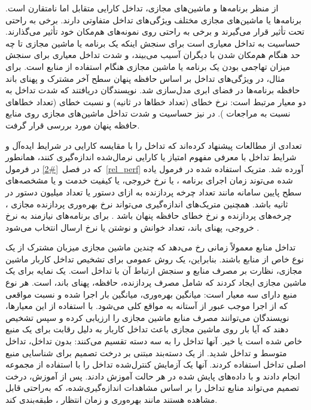 از منظر برنامه‌ها و ماشین‌های مجازی، تداخل کارایی متقابل اما نامتقارن است. برنامه‌ها یا ماشین‌های مجازی مختلف ویژگی‌های تداخل متفاوتی دارند. برخی به ‌راحتی تحت تأثیر قرار می‌گیرند و برخی به ‌راحتی روی نمونه‌های هم‌مکان خود تأثیر می‌گذارند. حساسیت به تداخل معیاری است برای سنجش اینکه یک برنامه یا ماشین مجازی تا چه حد هنگام هم‌مکان شدن با دیگران آسیب می‌بیند، و شدت تداخل معیاری برای سنجش میزان تهاجمی بودن یک برنامه یا ماشین مجازی هنگام استفاده از منابع است. برای مثال، در \cite{kim2013vmconsolidation} ویژگی‌های تداخل بر اساس حافظه پنهان سطح آخر  مشترک و پهنای باند حافظه برنامه‌ها در فضای ابری مدل‌سازی شد. نویسندگان دریافتند که شدت تداخل به دو معیار مرتبط است: نرخ خطای  (تعداد خطاها در ثانیه) و نسبت خطای  (تعداد خطاهای  نسبت به مراجعات ). در \cite{Chen2016Cache} نیز حساسیت و شدت تداخل ماشین‌های مجازی روی منابع حافظه پنهان مورد بررسی قرار گرفت.

تعدادی از مطالعات پیشنهاد کرده‌اند که تداخل را با مقایسه کارایی در شرایط ایده‌آل و شرایط تداخل با معرفی مفهوم امتیاز یا کارایی نرمال‌شده اندازه‌گیری کنند\cite{novakovic2013deepdive, cheng2017precise}، همانطور که در فصل~\ref{#2} در فرمول~\ref{rel_perf} آورده شد. متریک استفاده شده در فرمول یاده شده می‌توند زمان اجرای برنامه \cite{ novakovic2013deepdive, Zhao2016Interference, Chen2017Prophet, Javadi2016UIE}، یا نرخ خروجی\cite{Chiang2011TRACON}، یا کیفیت خدمت \cite{Yang2013BubbleFluxConf} و یا مشخصه‌های سطح پایین سامانه مانند تعداد چرخه پردازنده به ازای دستور  یا تعداد میلیون دستور در ثانیه  \cite{novakovic2013deepdive, cheng2017precise, Zhang2013CPI2} باشد. همچنین متریک‌های اندازه‌گیری می‌تواند نرخ بهره‌وری پردازنده مجازی ، چرخه‌های پردازنده و نرخ خطای حافظه پنهان باشد \cite{Sun2014MVEI}. برای برنامه‌های نیازمند به  نرخ خروجی، پهنای باند، تعداد خوانش و نوشتن یا نرخ ارسال انتخاب می‌شود \cite{Casale2011StorageIO}.

تداخل منابع معمولاً زمانی رخ می‌دهد که چندین ماشین مجازی میزبان مشترک از یک نوع خاص از منابع باشند. بنابراین، یک روش عمومی برای تشخیص تداخل کاربار ماشین مجازی، نظارت بر مصرف منابع و سنجش ارتباط آن با تداخل است. \cite{Peng2018VMProfiling} یک نمایه برای یک ماشین مجازی ایجاد کردند که شامل مصرف پردازنده،‌ حافظه، پهنای باند،  است. هر نوع منبع دارای سه معیار است: میانگین بهره‌وری، میانگین بار اجرا شده و نسبت مواقعی که از اجرا موجب عبور از آستانه به مواقع کلی می‌شود. با استفاده از این معیارها، نویسندگان می‌توانند مصرف منابع ماشین مجازی را ارزیابی کرده و سپس تشخیص دهند که آیا بار روی ماشین مجازی باعث تداخل کاربار به دلیل رقابت برای یک منبع خاص شده است یا خیر. آنها تداخل را به سه دسته تقسیم می‌کنند: بدون تداخل، تداخل متوسط و تداخل شدید. \cite{Javadi2017DIAL} از یک دسته‌بند مبتنی بر درخت تصمیم برای شناسایی منبع اصلی تداخل استفاده کردند. آنها یک آزمایش کنترل‌شده تداخل را با استفاده از مجموعه  انجام دادند و با داده‌های پایش شده در هر حالت آموزش دادند. پس از آموزش، درخت تصمیم می‌تواند منابع تداخل را بر اساس مشاهدات اندازه‌گیری‌شده، که به‌راحتی قابل مشاهده هستند مانند بهره‌وری  و زمان انتظار ، طبقه‌بندی کند.

